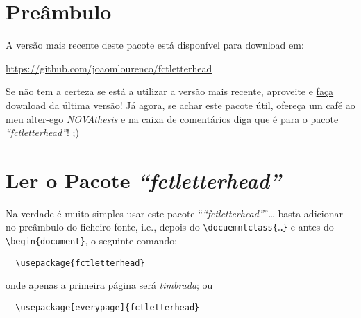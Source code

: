 \documentclass[a4paper]{article}
\title{\theTitle}
\author{\theAuthor}
\newcommand*{\thePackage}{\emph{“fctletterhead”}}
\begin{document}
\maketitle

\thispagestyle{empty}%

\begin{abstract}
    Este documento é simultaneamente um manual de instruções e um exemplo de como usar o pacote “\thePackage”.  Este pacote permite produzir documentos em \emph{papel letterhead} da FCT-NOVA.
\end{abstract}


\section{Preâmbulo}

A versão mais recente deste pacote está disponível para download em:

\begin{center}
  \url{https://github.com/joaomlourenco/fctletterhead}
\end{center}

Se não tem a certeza se está a utilizar a versão mais recente, aproveite e \href{https://github.com/joaomlourenco/fctletterhead/archive/refs/heads/main.zip}{faça download} da última versão!   Já agora, se achar este pacote útil, \href{https://www.paypal.com/donate/?hosted_button_id=8WA8FRVMB78W8}{ofereça um café} ao meu alter-ego \emph{NOVAthesis} e na caixa de comentários diga que é para o pacote \thePackage! ;)


\section{Ler o Pacote \thePackage}

Na verdade é muito simples usar este pacote “\thePackage”…  basta adicionar no preâmbulo do ficheiro fonte, i.e., depois do \verb!\docuemntclass{…}! e antes do \verb!\begin{document}!, o seguinte comando:

\begin{verbatim}
  \usepackage{fctletterhead}
\end{verbatim}

\noindent onde apenas a primeira página será \emph{timbrada}; ou

\begin{verbatim}
  \usepackage[everypage]{fctletterhead}
\end{verbatim}
\end{document}
